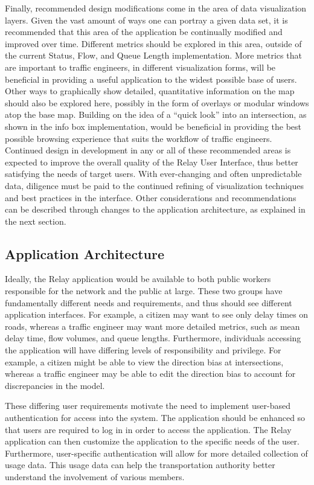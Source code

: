 \documentclass{report}
\begin{document}
Finally, recommended design modifications come in the area of data visualization layers.
Given the vast amount of ways one can portray a given data set, it is recommended that this area of the application be continually modified and improved over time.
Different metrics should be explored in this area, outside of the current Status, Flow, and Queue Length implementation.
More metrics that are important to traffic engineers, in different visualization forms, will be beneficial in providing a useful application to the widest possible base of users.
Other ways to graphically show detailed, quantitative information on the map should also be explored here, possibly in the form of overlays or modular windows atop the base map.
Building on the idea of a ``quick look'' into an intersection, as shown in the info box implementation, would be beneficial in providing the best possible browsing experience that suits the workflow of traffic engineers.
Continued design in development in any or all of these recommended areas is expected to improve the overall quality of the Relay User Interface, thus better satisfying the needs of target users.
With ever-changing and often unpredictable data, diligence must be paid to the continued refining of visualization techniques and best practices in the interface.
Other considerations and recommendations can be described through changes to the application architecture, as explained in the next section.

\subsection{Application Architecture}

Ideally, the Relay application would be available to both public workers responsible for the network and the public at large. These two groups have fundamentally different needs and requirements, and thus should see different application interfaces. For example, a citizen may want to see only delay times on roads, whereas a traffic engineer may want more detailed metrics, such as mean delay time, flow volumes, and queue lengths. Furthermore, individuals accessing the application will have differing levels of responsibility and privilege. For example, a citizen might be able to view the direction bias at intersections, whereas a traffic engineer may be able to edit the direction bias to account for discrepancies in the model.

These differing user requirements motivate the need to implement user-based authentication for access into the system. The application should be enhanced so that users are required to log in in order to access the application. The Relay application can then customize the application to the specific needs of the user. Furthermore, user-specific authentication will allow for more detailed collection of usage data. This usage data can help the transportation authority better understand the involvement of various members.
\end{document}
